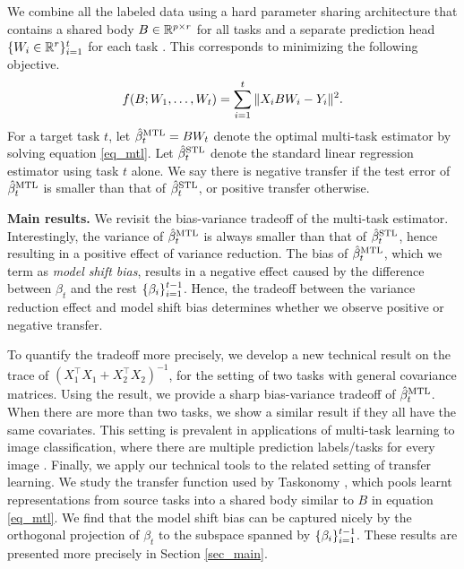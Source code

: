 We combine all the labeled data using a hard parameter sharing architecture that contains a shared body $B\in\mathbb{R}^{p\times r}$ for all tasks and a separate prediction head $\{W_i \in \mathbb{R}^{r}\}_{i=1}^t$ for each task \cite{R17,MTDNN19,WZR20}.
This corresponds to minimizing the following objective.
\begin{align}
	\label{eq_mtl}
	f(B; W_1, \dots, W_t) = \sum_{i=1}^t \|X_i B W_i - Y_i\|^2.
\end{align}
For a target task $t$,
let $\hat{\beta}_t^{\text{MTL}} = B W_t$ denote the optimal multi-task estimator by solving equation \eqref{eq_mtl}.
Let $\hat{\beta}_t^{\text{STL}}$ denote the standard linear regression estimator using task $t$ alone.
We say there is negative transfer if the test error of $\hat{\beta}_t^{\text{MTL}}$  is smaller than that of $\hat{\beta}_t^{\text{STL}}$, or positive transfer otherwise.

\textbf{Main results.}
We revisit the bias-variance tradeoff of the multi-task estimator.
Interestingly, the variance of $\hat{\beta}_t^{\text{MTL}}$ is always smaller than that of $\hat{\beta}_t^{\text{STL}}$, hence resulting in a positive effect of variance reduction.
The bias of $\hat{\beta}_t^{\text{MTL}}$, which we term as \textit{model shift bias}, results in a negative effect caused by the difference between $\beta_t$ and the rest $\{\beta_i\}_{i=1}^{t-1}$.
Hence, the tradeoff between the variance reduction effect and model shift bias determines whether we observe positive or negative transfer.

To quantify the tradeoff more precisely, we develop a new technical result on the trace of $(X_1^{\top}X_1 + X_2^{\top}X_2)^{-1}$, for the setting of two tasks with general covariance matrices.
Using the result, we provide a sharp bias-variance tradeoff of $\hat{\beta}_t^{\text{MTL}}$.
When there are more than two tasks, we show a similar result if they all have the same covariates.
This setting is prevalent in applications of multi-task learning to image classification, where there are multiple prediction labels/tasks for every image \cite{chexnet17,EA20}.
Finally, we apply our technical tools to the related setting of transfer learning.
We study the transfer function used by Taskonomy \cite{ZSSGM18}, which pools learnt representations from source tasks into a shared body similar to $B$ in equation \eqref{eq_mtl}.
We find that the model shift bias can be captured nicely by the orthogonal projection of $\beta_t$ to the subspace spanned by $\{\beta_i\}_{i=1}^{t-1}$.
These results are presented more precisely in Section \ref{sec_main}.

